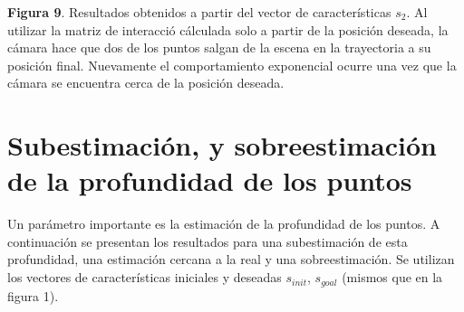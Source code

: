 \documentclass{article}
\begin{document}
\begin{center}
	{\footnotesize \textbf{Figura 9}. Resultados obtenidos a partir del vector de caracter\'isticas $s_2$. Al utilizar la matriz de interacci\'o c\'alculada solo a partir de la posici\'on deseada, la c\'amara hace que dos de los puntos salgan de la escena en la trayectoria a su posici\'on final. Nuevamente el comportamiento exponencial ocurre una vez que la c\'amara se encuentra cerca de la posici\'on deseada.}
	\end{center}\newpage
	
	\section{Subestimaci\'on, y sobreestimaci\'on de la profundidad de los puntos}
	Un par\'ametro importante es la estimaci\'on de la profundidad de los puntos. A continuaci\'on se presentan los resultados para una subestimaci\'on de esta profundidad, una estimaci\'on cercana a la real y una sobreestimaci\'on. Se utilizan los vectores de caracter\'isticas iniciales y deseadas $s_{init}$, $s_{goal}$ (mismos que en la figura 1).
	
\end{document}

